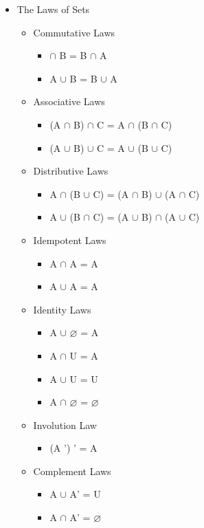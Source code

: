 \documentclass[11pt]{article}
\begin{document}
\begin{itemize}
  \item The Laws of Sets
  \begin{itemize}
    \item Commutative Laws
    \begin{itemize}
       \item $\cap$ B = B $\cap$ A
       \item A $\cup$ B = B $\cup$ A
    \end{itemize}
    \item Associative Laws
    \begin{itemize}
       \item (A $\cap$ B) $\cap$ C = A $\cap$ (B $\cap$ C)
       \item (A $\cup$ B) $\cup$ C = A $\cup$ (B $\cup$ C)
    \end{itemize}
    \item Distributive Laws
    \begin{itemize}
       \item A $\cap$ (B $\cup$ C) = (A $\cap$ B) $\cup$ (A $\cap$ C)
       \item A $\cup$ (B $\cap$ C) = (A $\cup$ B) $\cap$ (A $\cup$ C)
    \end{itemize}
    \item Idempotent Laws
    \begin{itemize}
       \item A $\cap$ A = A
       \item A $\cup$ A = A
    \end{itemize}
    \item Identity Laws
    \begin{itemize}
       \item A $\cup$ $\varnothing$ = A
       \item A $\cap$ U = A
       \item A $\cup$ U = U
       \item A $\cap$ $\varnothing$ = $\varnothing$
    \end{itemize}
    \item Involution Law
    \begin{itemize}
       \item (A ') ' = A
    \end{itemize}
    \item Complement Laws
    \begin{itemize}
       \item A $\cup$ A' = U
       \item A $\cap$ A' = $\varnothing$

\end{itemize}
\end{itemize}
\end{itemize}
\end{document}
